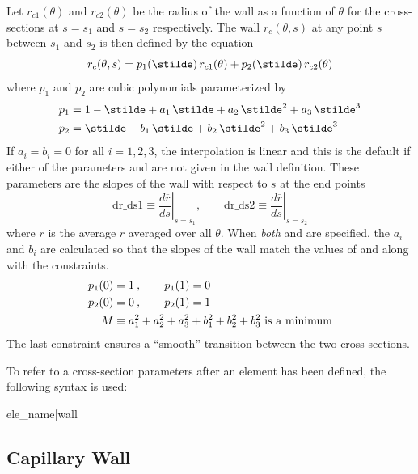 Let $r_{c1}(\theta)$ and $r_{c2}(\theta)$ be the radius of the wall as a function of $\theta$ for
the cross-sections at $s = s_1$ and $s = s_2$ respectively. The wall $r_c(\theta, s)$ at any point
$s$ between $s_1$ and $s_2$ is then defined by the equation
\begin{equation}
  r_c(\theta, s) = p_1(\stilde) \, r_{c1}(\theta) + p_2(\stilde) \, r_{c2}(\theta)
\end{equation}
where $p_1$ and $p_2$ are cubic polynomials parameterized by
\begin{align}
  p_1 &= 1 - \stilde + a_1 \, \stilde + a_2 \, \stilde^2 + a_3 \, \stilde^3 \CRNO
  p_2 &= \stilde + b_1 \, \stilde + b_2 \, \stilde^2 + b_3 \, \stilde^3 
\end{align}
If $a_i = b_i = 0$ for all $i = 1, 2, 3$, the interpolation is linear and this is the default if
either of the parameters  and  are not given in the wall definition. These
parameters are the slopes of the wall with respect to $s$ at the end points
\begin{equation}
  \text{dr_ds1} \equiv \left. \frac{d\overline{r}}{ds} \right|_{s = s_1} \comma \qquad
  \text{dr_ds2} \equiv \left. \frac{d\overline{r}}{ds} \right|_{s = s_2} 
\end{equation}
where $\overline{r}$ is the average $r$ averaged over all $\theta$. When {\em both}  and
 are specified, the $a_i$ and $b_i$ are calculated so that the slopes of the wall match
the values of  and  along with the constraints.
\begin{align}
  p_1(0) &= 1 \> , \qquad p_1(1) = 0 \nonumber \\
  p_2(0) &= 0 \> , \qquad p_2(1) = 1 \\
  M &\equiv a_1^2 + a_2^2 + a_3^2 + b_1^2 + b_2^2 + b_3^2 \text{ is a minimum}
  \nonumber
\end{align}
The last constraint ensures a ``smooth'' transition between the two cross-sections.

To refer to a cross-section parameters after an element has been defined, the following syntax is
used:
\begin{example}
  ele_name[wall%
\end{example}

\subsection{Capillary Wall}
\label{s:wall.capillary}

